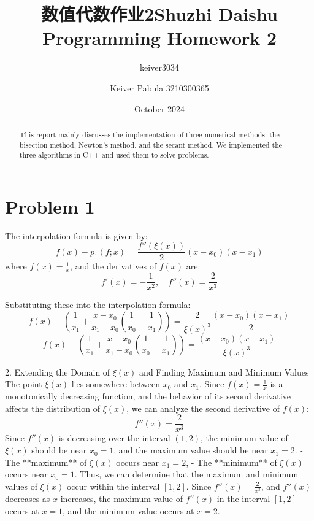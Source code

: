 \documentclass{article}
\title{数值代数作业2}
\author{keiver3034 }
\date{October 2024}
\begin{document}
\title{Shuzhi Daishu Programming Homework 2}

\author{Keiver Pabula 3210300365}

\maketitle

\begin{abstract}
   This report mainly discusses the implementation of three numerical methods: the bisection method, Newton's method, and the secant method. We implemented the three algorithms in C++ and used them to solve problems.
\end{abstract}

\section*{Problem 1}
The interpolation formula is given by:
\[f(x) - p_1(f; x) = \frac{f''(\xi(x))}{2} (x - x_0)(x - x_1)\]
where \( f(x) = \frac{1}{x} \), and the derivatives of \( f(x) \) are:
\[f'(x) = -\frac{1}{x^2}, \quad f''(x) = \frac{2}{x^3}\]

Substituting these into the interpolation formula:
\[f(x) - \left(\frac{1}{x_1} + \frac{x - x_0}{x_1 - x_0} \left(\frac{1}{x_0} - \frac{1}{x_1}\right)\right) = \frac{2}{\xi(x)^3} \frac{(x - x_0)(x - x_1)}{2}\]
\[f(x) - \left(\frac{1}{x_1} + \frac{x - x_0}{x_1 - x_0} \left(\frac{1}{x_0} - \frac{1}{x_1}\right)\right) = \frac{(x - x_0)(x - x_1)}{\xi(x)^3}\]

2. Extending the Domain of \( \xi(x) \) and Finding Maximum and Minimum Values
The point \( \xi(x) \) lies somewhere between \( x_0 \) and \( x_1 \). Since \( f(x) = \frac{1}{x} \) is a monotonically decreasing function, and the behavior of its second derivative affects the distribution of \( \xi(x) \), we can analyze the second derivative of \( f(x) \):
\[f''(x) = \frac{2}{x^3}\]
Since \( f''(x) \) is decreasing over the interval \( (1, 2) \), the minimum value of \( \xi(x) \) should be near \( x_0 = 1 \), and the maximum value should be near \( x_1 = 2 \).
- The **maximum** of \( \xi(x) \) occurs near \( x_1 = 2 \),
- The **minimum** of \( \xi(x) \) occurs near \( x_0 = 1 \).
Thus, we can determine that the maximum and minimum values of \( \xi(x) \) occur within the interval \( [1, 2] \).
Since \( f''(x) = \frac{2}{x^3} \), and \( f''(x) \) decreases as \( x \) increases, the maximum value of \( f''(x) \) in the interval \( [1, 2] \) occurs at \( x = 1 \), and the minimum value occurs at \( x = 2 \).
\end{document}
